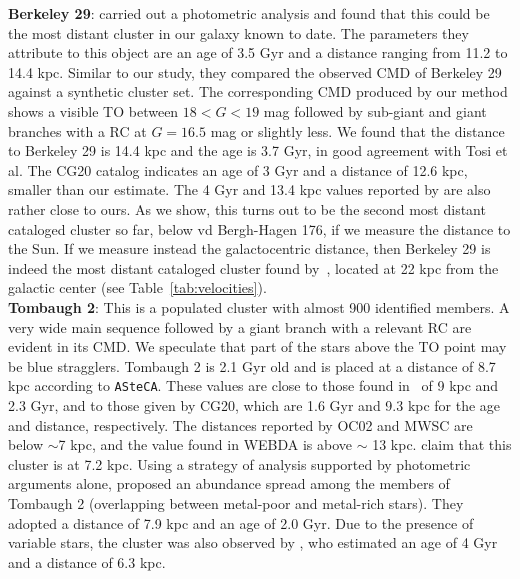 \documentclass{aa}
\begin{document}
\begin{appendix}
  \noindent \textbf{Berkeley 29}: \cite{Tosi_2004} carried out a photometric analysis
  and found that this could be the most distant cluster in our galaxy known to date.
  The parameters they attribute to this object are an age of 3.5 Gyr and a
  distance ranging from 11.2 to 14.4 kpc.
  Similar to our study, they compared the observed CMD of Berkeley 29 against a
  synthetic cluster set. The corresponding CMD produced by our method
  shows a visible TO between $18<G<19$ mag followed by  sub-giant and giant
  branches with a RC at $G=16.5$ mag or slightly less. We found that the
  distance to Berkeley 29 is 14.4 kpc and the age is 3.7 Gyr, in good
  agreement with Tosi et al. The CG20 catalog indicates an age of 3 Gyr and a
  distance of 12.6 kpc, smaller than our estimate. The 4 Gyr and 13.4
  kpc values reported by \cite{Frinchaboy_2006} are also rather close to ours.
  As we show, this turns out to be the second most
  distant cataloged cluster so far, below vd Bergh-Hagen 176, if we measure
  the distance to the Sun. If we measure instead the galactocentric distance,
  then Berkeley 29 is indeed the most distant cataloged cluster  found
  by~\cite{Tosi_2004}, located at 22 kpc from the galactic center (see
  Table~\ref{tab:velocities}).\\

  \noindent \textbf{Tombaugh 2}: This is a populated cluster with almost 900 identified
  members. A very wide main sequence followed by a giant branch with a relevant
  RC are evident in its CMD. We speculate that part of the stars
  above the TO point may be blue stragglers. Tombaugh 2 is 2.1 Gyr old and is
  placed at a distance of 8.7 kpc according to \texttt{ASteCA}. These values are
  close to those found in~\cite{Dias_2021} of 9 kpc and 2.3 Gyr, and
  to those given by CG20, which are 1.6 Gyr and 9.3 kpc for the age
  and distance, respectively. The distances reported by OC02 and MWSC are below
  $\sim$7 kpc, and the value found in WEBDA is above $\sim$ 13 kpc.
  \cite{Villanova_2010} claim that this cluster is at 7.2 kpc.
  Using a strategy of analysis supported by photometric arguments alone, 
  \cite{Frinchaboy_2008} proposed an abundance spread among the members of
  Tombaugh 2 (overlapping between metal-poor and metal-rich stars). They adopted a
  distance of 7.9 kpc and an age of 2.0 Gyr.
  Due to the presence of variable stars, the cluster was also observed by
  \cite{Kubiak_1992}, who estimated an age of 4 Gyr and a distance of 6.3 kpc.\\


\end{appendix}
\end{document}
